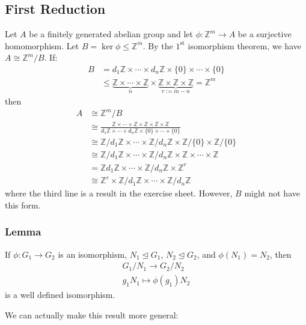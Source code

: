 \documentclass{article}
\begin{document}
\subsection{First Reduction}
Let $A$ be a finitely generated abelian group and let $\phi: \mathbb{Z}^m \rightarrow A$ be a surjective homomorphism. Let $B = \ker\phi \le \mathbb{Z}^m$. By the $1^\text{st}$ isomorphism theorem, we have $A \cong \mathbb{Z}^m/B$. If:
\begin{align*}
    B & = d_1\mathbb{Z}\times \cdots \times d_n\mathbb{Z} \times \{0\} \times \cdots \times \{0\}                                                                  \\
      & \le \underbrace{\mathbb{Z} \times \cdots \times \mathbb{Z}}_{n} \times \underbrace{\mathbb{Z} \times \mathbb{Z} \times \mathbb{Z}}_{r:=m-n} = \mathbb{Z}^m
\end{align*}
then
\begin{align*}
    A & \cong \mathbb{Z}^m/B                                                                                                                                                                                       \\
      & \cong \frac{{\mathbb{Z} \times \cdots \times \mathbb{Z}} \times {\mathbb{Z} \times \mathbb{Z} \times \mathbb{Z}}}{d_1\mathbb{Z}\times \cdots \times d_n\mathbb{Z} \times \{0\} \times \cdots \times \{0\}} \\
      & \cong \mathbb{Z}/d_1\mathbb{Z} \times \cdots \times \mathbb{Z}/d_n\mathbb{Z} \times \mathbb{Z}/\{0\} \times \mathbb{Z}/\{0\}                                                                               \\
      & \cong \mathbb{Z}/d_1\mathbb{Z} \times \cdots \times \mathbb{Z}/d_n\mathbb{Z} \times \mathbb{Z} \times \cdots \times \mathbb{Z}                                                                             \\
      & = \mathbb{Z}d_1\mathbb{Z} \times \cdots \times \mathbb{Z}/d_n\mathbb{Z} \times \mathbb{Z}^r                                                                                                                \\
      & \cong \mathbb{Z}^r \times \mathbb{Z}/d_1\mathbb{Z} \times \cdots \times \mathbb{Z}/d_n \mathbb{Z}
\end{align*}
where the third line is a result in the exercise sheet. However, $B$ might not have this form.

\subsubsection{Lemma}
\begin{idea}
    If $\phi: G_1\rightarrow G_2$ is an isomorphism, $N_1 \trianglelefteq G_1$, $N_2 \trianglelefteq G_2$, and $\phi(N_1)=N_2$, then
    \begin{align*}
        G_1/N_1 \rightarrow G_2/N_2 \\
        g_1N_1 \mapsto \phi(g_1)N_2
    \end{align*}
    is a well defined isomorphism.
\end{idea}
We can actually make this result more general:
\end{document}
